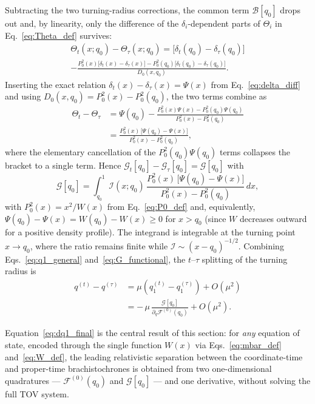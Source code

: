 \documentclass[
  aps,
  prd,
  twocolumn,
  nofootinbib,
  superscriptaddress,
  longbibliography
]{revtex4-2}
\begin{document}
Subtracting the two turning-radius corrections, the common term
$\mathcal{B}[q_0]$ drops out and, by linearity, only the difference of
the $\delta_i$-dependent parts of $\Theta_i$ in
Eq.~\eqref{eq:Theta_def} survives:
\begin{multline}
\Theta_t(x;q_0)-\Theta_\tau(x;q_0)
=
\bigl[\delta_t(q_0)-\delta_\tau(q_0)\bigr]
\\
-\frac{P_0^2(x)\bigl[\delta_t(x)-\delta_\tau(x)\bigr]
       -P_0^2(q_0)\bigl[\delta_t(q_0)-\delta_\tau(q_0)\bigr]}
      {D_0(x,q_0)}.
\end{multline}
Inserting the exact relation $\delta_t(x)-\delta_\tau(x)=\Psi(x)$ from
Eq.~\eqref{eq:delta_diff} and using
$D_0(x,q_0)=P_0^2(x)-P_0^2(q_0)$, the two terms combine as
\begin{equation}
\begin{aligned}
\Theta_t-\Theta_\tau
&=
\Psi(q_0)
-\frac{P_0^2(x)\Psi(x)-P_0^2(q_0)\Psi(q_0)}{P_0^2(x)-P_0^2(q_0)}
\\[4pt]
&=
\frac{P_0^2(x)\,\bigl[\Psi(q_0)-\Psi(x)\bigr]}
     {P_0^2(x)-P_0^2(q_0)},
\end{aligned}
\end{equation}
where the elementary cancellation of the $P_0^2(q_0)\Psi(q_0)$ terms
collapses the bracket to a single term. Hence
$\mathcal{G}_t[q_0]-\mathcal{G}_\tau[q_0]=\mathcal{G}[q_0]$ with
\begin{equation}
\mathcal{G}[q_0]
=
\int_{q_0}^1
\mathcal{I}(x;q_0)\,
\frac{P_0^2(x)\,\bigl[\Psi(q_0)-\Psi(x)\bigr]}
     {P_0^2(x)-P_0^2(q_0)}
\,dx,
\label{eq:G_functional}
\end{equation}
with $P_0^2(x)=x^2/W(x)$ from Eq.~\eqref{eq:P0_def} and, equivalently,
$\Psi(q_0)-\Psi(x)=W(q_0)-W(x)\ge0$ for $x>q_0$ (since $W$ decreases
outward for a positive density profile). The integrand is integrable at the
turning point $x\to q_0$, where the ratio remains finite while
$\mathcal{I}\sim(x-q_0)^{-1/2}$. Combining
Eqs.~\eqref{eq:q1_general} and~\eqref{eq:G_functional}, the $t$--$\tau$
splitting of the turning radius is
\begin{equation}
\boxed{
\begin{aligned}
q^{(t)}-q^{(\tau)}
&=
\mu\left(q_1^{(t)}-q_1^{(\tau)}\right)+O(\mu^2)
\\[4pt]
&=
-\,\mu\,
\frac{\mathcal{G}[q_0]}{\partial_q\mathcal{F}^{(0)}(q_0)}
+O(\mu^2).
\end{aligned}
}
\label{eq:dq1_final}
\end{equation}

Equation~\eqref{eq:dq1_final} is the central result of this section:
for \emph{any} equation of state, encoded through the single function
$W(x)$ via Eqs.~\eqref{eq:mbar_def} and~\eqref{eq:W_def}, the leading
relativistic separation between the coordinate-time and proper-time
brachistochrones is obtained from two one-dimensional quadratures ---
$\mathcal{F}^{(0)}(q_0)$ and $\mathcal{G}[q_0]$ --- and one derivative,
without solving the full TOV system.
\end{document}
